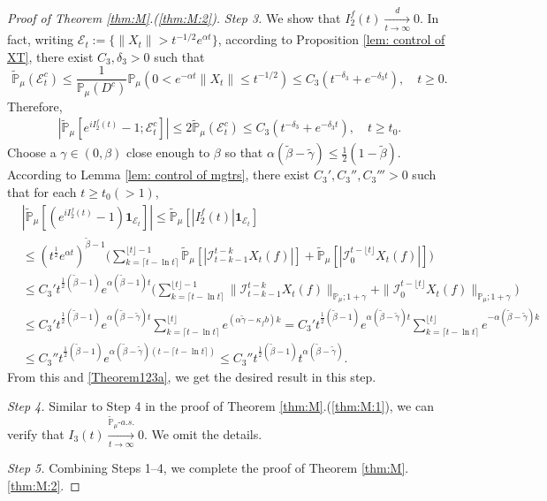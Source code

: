 \documentclass[EJP]{ejpecp} %
\begin{document}
\begin{proof}[Proof of Theorem \ref{thm:M}.(\ref{thm:M:2})]
  \emph{Step 3.}
  We show that $ I^f_2(t)\xrightarrow[t\to \infty]{d} 0$.
  In fact, writing $\mathcal{E}_t:=\{\|X_t\|>t^{-1/2}e^{\alpha t}\}$, according to Proposition \ref{lem: control of XT}, there exist $C_3, \delta_3>0$ such that
  \[
    \mathbb{\widetilde{P}}_{\mu}(\mathcal{E}^c_t)
    \leq \frac{1}{\mathbb{P}_{\mu}(D^c)}\mathbb{P}_{\mu}(0<e^{-\alpha t}\|X_t\|\leq t^{-1/2})\leq C_3( t^{-\delta_3}+e^{-\delta_3 t})
    , \quad t\geq0.
  \]
  Therefore,
  \begin{align}
   \label{Theorem123a}
    |\mathbb{\widetilde{P}}_{\mu}[e^{i I^f_2(t)}-1;\mathcal{E}^c_t]|
    \leq 2\mathbb{\widetilde{P}}_{\mu}(\mathcal{E}^c_t)
    \leq C_3(t^{-\delta_3}+e^{-\delta_3 t}),
    \quad t\geq t_0.
  \end{align}
  Choose a $\gamma\in (0,\beta)$ close enough to $\beta$ so that $\alpha(\tilde \beta - \tilde \gamma) \leq \frac{1}{2}(1- \tilde \beta)$.
	According to Lemma \ref{lem: control of mgtrs}, there exist $C_3',C_3'',C_3'''>0$ such that for each $t\geq t_0 (>1)$,
  \begin{align}
    & |\mathbb{\widetilde{P}}_{\mu} [ (e^{i I^f_2(t)}-1)\mathbf{1}_{\mathcal{E}_t}]|
      \leq  \mathbb{\widetilde{P}}_{\mu} [ |I^f_2(t)|\mathbf{1}_{\mathcal{E}_t}] \\
    & \leq  (t^{\frac{1}{2}} e^{\alpha t} )^{\tilde \beta - 1}\Big(\sum_{k=\lceil t-\ln t \rceil}^{\lfloor t \rfloor - 1}\mathbb{\widetilde{P}}_{\mu} [| \mathcal{I}_{t-k-1}^{t-k} X_t(f) |] + \mathbb{\widetilde{P}}_{\mu}[| \mathcal{I}_{0}^{t-\lfloor t\rfloor} X_t(f)|]\Big) \\
    & \leq C_3' t^{\frac{1}{2}(\tilde \beta - 1)} e^{\alpha(\tilde \beta - 1)t}\Big(\sum_{k=\lceil t-\ln t \rceil}^{\lfloor t \rfloor - 1}\|\mathcal{I}_{t-k-1}^{t-k} X_t(f) \|_{\mathbb P_\mu; 1+\gamma} + \|\mathcal I_0^{t-\lfloor t \rfloor} X_t(f)\|_{\mathbb P_\mu;1+\gamma}\Big) \\
    & \leq C_3' t^{\frac{1}{2}(\tilde \beta - 1)} e^{\alpha (\tilde \beta - \tilde \gamma)t}\sum_{k=\lceil t-\ln t \rceil}^{\lfloor t \rfloor}  e^{(\alpha\tilde \gamma-\kappa_f b)k}
      = C_3' t^{\frac{1}{2}(\tilde \beta - 1)} e^{\alpha(\tilde \beta - \tilde \gamma) t}\sum_{k=\lceil t-\ln t \rceil}^{\lfloor t \rfloor}  e^{-\alpha (\tilde \beta -\tilde \gamma) k}
    \\ & \leq C_3'' t^{\frac{1}{2}(\tilde \beta - 1)} e^{\alpha (\tilde \beta - \tilde \gamma)(t - \lceil t - \ln t\rceil)}
         \leq C_3'' t^{\frac{1}{2}(\tilde \beta - 1)} t^{\alpha (\tilde \beta - \tilde \gamma)}.
  \end{align}
  From this and \eqref{Theorem123a}, we get the desired result in this step.

  \emph{Step 4.} Similar to Step 4 in the proof of Theorem \ref{thm:M}.(\ref{thm:M:1}), we can verify that $I_3(t) \xrightarrow[t\to \infty]{\widetilde {\mathbb P}_\mu \text{-} a.s.} 0$.
  We omit the details.

 	\emph{Step 5.} Combining Steps 1--4, we complete the proof of Theorem \ref{thm:M}.\eqref{thm:M:2}.
\end{proof}
\end{document}
